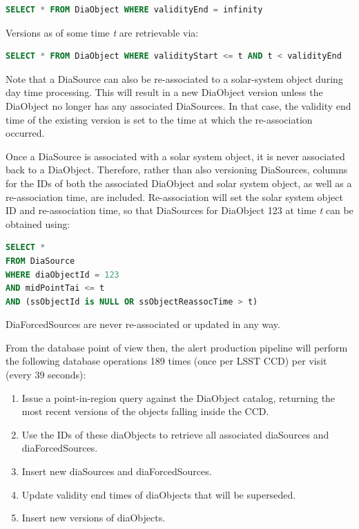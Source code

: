 \documentclass[DM,toc]{lsstdoc}
\begin{document}
\begin{lstlisting}[language=SQL]
SELECT * FROM DiaObject WHERE validityEnd = infinity
\end{lstlisting}

Versions as of some time \emph{t} are retrievable via:

\begin{lstlisting}[language=SQL]
SELECT * FROM DiaObject WHERE validityStart <= t AND t < validityEnd
\end{lstlisting}

Note that a DiaSource can also be re-associated to a solar-system object
during day time processing. This will result in a new DiaObject version unless
the DiaObject no longer has any associated DiaSources. In that case, the
validity end time of the existing version is set to the time at which the re-association
occurred.

Once a DiaSource is associated with a solar system object, it is never
associated back to a DiaObject. Therefore, rather than also versioning
DiaSources, columns for the IDs of both the associated DiaObject and solar
system object, as well as a re-association time, are included. Re-association
will set the solar system object ID and re-association time, so that
DiaSources for DiaObject 123 at time \emph{t} can be obtained using:

\begin{lstlisting}[language=SQL]
SELECT *
FROM DiaSource
WHERE diaObjectId = 123
AND midPointTai <= t
AND (ssObjectId is NULL OR ssObjectReassocTime > t)
\end{lstlisting}

DiaForcedSources are never re-associated or updated in any way.

From the database point of view then, the alert production pipeline will
perform the following database operations 189 times (once per LSST CCD) per
visit (every 39 seconds):

\begin{enumerate}
\def\labelenumi{\arabic{enumi}.}
\item
  Issue a point-in-region query against the DiaObject catalog, returning
  the most recent versions of the objects falling inside the CCD.
\item
  Use the IDs of these diaObjects to retrieve all associated diaSources
  and diaForcedSources.
\item
  Insert new diaSources and diaForcedSources.
\item
  Update validity end times of diaObjects that will be superseded.
\item
  Insert new versions of diaObjects.
\end{enumerate}
\end{document}
